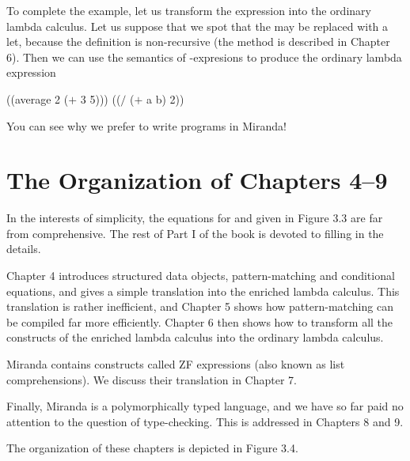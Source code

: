 To complete the example, let us transform the expression into the ordinary lambda calculus. Let us suppose that we spot that the  may be replaced with a let, because the definition is non-recursive (the method is described in Chapter 6). Then we can use the semantics of -expresions to produce the ordinary lambda expression
\begin{mlcoded}
    ((average 2 ($+$ 3 5))) (($/$ ($+$ a b) 2))
\end{mlcoded}
You can see why we prefer to write programs in Miranda!

\section{The Organization of Chapters 4--9}

In the interests of simplicity, the equations for  and  given in Figure 3.3 are far from comprehensive. The rest of Part I of the book is devoted to filling in the details.

Chapter 4 introduces structured data objects, pattern-matching and conditional equations, and gives a simple translation into the enriched lambda calculus. This translation is rather inefficient, and Chapter 5 shows how pattern-matching can be compiled far more efficiently. Chapter 6 then shows how to transform all the constructs of the enriched lambda calculus into the ordinary lambda calculus.

Miranda contains constructs called ZF expressions (also known as list comprehensions). We discuss their translation in Chapter 7.

Finally, Miranda is a polymorphically typed language, and we have so far paid no attention to the question of type-checking. This is addressed in Chapters 8 and 9.

The organization of these chapters is depicted in Figure 3.4.

